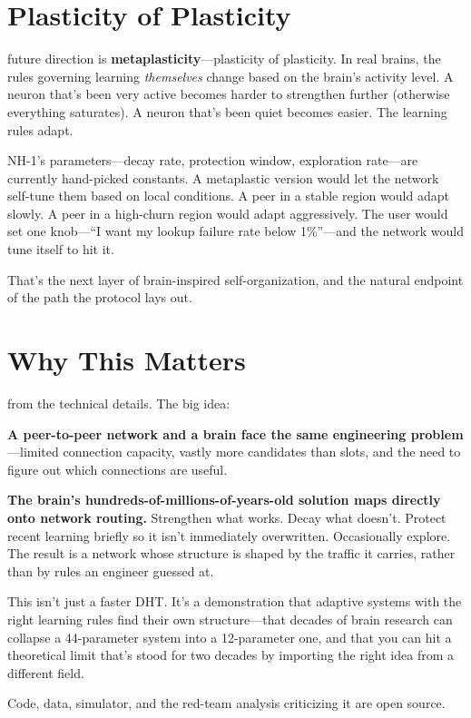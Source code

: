 \documentclass[nobib]{tufte-handout}
\begin{document}
\section{Plasticity of Plasticity}

 future direction is \textbf{metaplasticity}---plasticity of plasticity. In real brains, the rules governing learning \emph{themselves} change based on the brain's activity level. A neuron that's been very active becomes harder to strengthen further (otherwise everything saturates). A neuron that's been quiet becomes easier. The learning rules adapt.

NH-1's parameters---decay rate, protection window, exploration rate---are currently hand-picked constants. A metaplastic version would let the network self-tune them based on local conditions. A peer in a stable region would adapt slowly. A peer in a high-churn region would adapt aggressively. The user would set one knob---``I want my lookup failure rate below 1\%''---and the network would tune itself to hit it.

That's the next layer of brain-inspired self-organization, and the natural endpoint of the path the protocol lays out.

\section{Why This Matters}

 from the technical details. The big idea:

\textbf{A peer-to-peer network and a brain face the same engineering problem}---limited connection capacity, vastly more candidates than slots, and the need to figure out which connections are useful.

\textbf{The brain's hundreds-of-millions-of-years-old solution maps directly onto network routing.} Strengthen what works. Decay what doesn't. Protect recent learning briefly so it isn't immediately overwritten. Occasionally explore. The result is a network whose structure is shaped by the traffic it carries, rather than by rules an engineer guessed at.

This isn't just a faster DHT. It's a demonstration that adaptive systems with the right learning rules find their own structure---that decades of brain research can collapse a 44-parameter system into a 12-parameter one, and that you can hit a theoretical limit that's stood for two decades by importing the right idea from a different field.

Code, data, simulator, and the red-team analysis criticizing it are open source.
\end{document}
